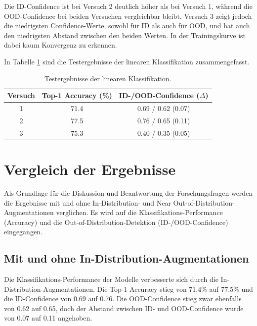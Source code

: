 Die ID-Confidence ist bei Versuch 2 deutlich höher als bei Versuch 1, während die OOD-Confidence bei beiden Versuchen vergleichbar bleibt. Versuch 3 zeigt jedoch die niedrigsten Confidence-Werte, sowohl für ID als auch für OOD, und hat auch den niedrigsten Abstand zwischen den beiden Werten. In der Trainingskurve ist dabei kaum Konvergenz zu erkennen.

In Tabelle \ref{tab:supcon-lin-results} sind die Testergebnisse der linearen Klassifikation zusammengefasst.

\begin{table}[h]
	\caption{Testergebnisse der linearen Klassifikation.}
	\begin{tabular}{|c|c|c|}
		\hline
		\textbf{Versuch} & \textbf{Top-1 Accuracy (\%)} & \textbf{ID-/OOD-Confidence ($\Delta$)} \\
		\hline
		1 & 71.4 & 0.69 / 0.62 (0.07) \\
		2 & 77.5 & 0.76 / 0.65 (0.11) \\
		3 & 75.3 & 0.40 / 0.35 (0.05) \\
		\hline
	\end{tabular}
	\label{tab:supcon-lin-results}
\end{table}

\section{Vergleich der Ergebnisse} \label{sec:results-comparison}

Als Grundlage für die Diskussion und Beantwortung der Forschungsfragen werden die Ergebnisse mit und ohne In-Distribution- und Near Out-of-Distribution-Augmentationen verglichen. Es wird auf die Klassifikations-Performance (Accuracy) und die Out-of-Distribution-Detektion (ID-/OOD-Confidence) eingegangen.

\subsection{Mit und ohne In-Distribution-Augmentationen} \label{sec:results-comparison-id}

Die Klassifikations-Performance der Modelle verbesserte sich durch die In-Distribution-Augmentationen. Die Top-1 Accuracy stieg von 71.4\% auf 77.5\% und die ID-Confidence von 0.69 auf 0.76. Die OOD-Confidence stieg zwar ebenfalls von 0.62 auf 0.65, doch der Abstand zwischen ID- und OOD-Confidence wurde von 0.07 auf 0.11 angehoben.

